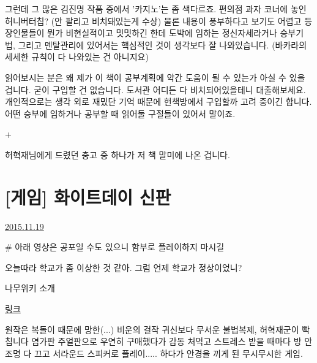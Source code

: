 그런데 그 많은 김진명 작품 중에서 '카지노'는 좀 색다르죠. 편의점 과자 코너에 놓인 허니버터칩? (안 팔리고 비치돼있는게 수상)
물론 내용이 풍부하다고 보기도 어렵고 등장인물들이 뭔가 비현실적이고 밋밋하긴 한데
도박에 임하는 정신자세라거나 승부기법, 그리고 멘탈관리에 있어서는 핵심적인 것이 생각보다 잘 나와있습니다.
(바카라의 세세한 규칙이 다 나와있는 건 아니지요)
\vspace{5mm}

읽어보시는 분은 왜 제가 이 책이 공부계획에 약간 도움이 될 수 있는가 아실 수 있을 겁니다.
굳이 구입할 건 없습니다. 도서관 어디든 다 비치되어있을테니 대출해보세요.
개인적으로는 생각 외로 재밌단 기억 때문에 헌책방에서 구입할까 고려 중이긴 합니다.
어떤 승부에 임하거나 공부할 때 읽어둘 구절들이 있어서 말이죠.
\vspace{5mm}

+
\vspace{5mm}

허혁재님에게 드렸던 충고 중 하나가 저 책 말미에 나온 겁니다.
\vspace{5mm}






\section{[게임] 화이트데이 신판}
\href{https://www.kockoc.com/Apoc/501645}{2015.11.19}

\vspace{5mm}

$\#$ 아래 영상은 공포일 수도 있으니 함부로 플레이하지 마시길
\vspace{5mm}

오늘따라 학교가 좀 이상한 것 같아. 그럼 언제 학교가 정상이었니?
\vspace{5mm}

나무위키 소개
\vspace{5mm}

\href{https://namu.wiki/w/%ED%99%94%EC%9D%B4%ED%8A%B8%EB%8D%B0%EC%9D%B4%3A%20%ED%95%99%EA%B5%90%EB%9D%BC%EB%8A%94%20%EC%9D%B4%EB%A6%84%EC%9D%98%20%EB%AF%B8%EA%B6%81(2015)$\#$rfn$-$18}{링크}
\vspace{5mm}

원작은 복돌이 때문에 망한(...) 비운의 걸작 귀신보다 무서운 불법복제, 허혁재군이 빡칩니다
염가판 주얼판으로 우연히 구매했다가 감동 처먹고
스트레스 받을 때마다 방 안 조명 다 끄고 서라운드 스피커로 플레이..... 하다가 안경을 끼게 된 무시무시한 게임.
\vspace{5mm}

